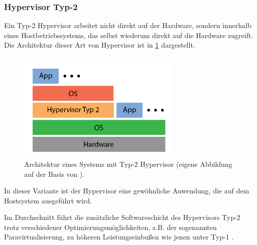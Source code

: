 \documentclass[../main.tex]{subfiles}
\begin{document}

			\subsubsection{Hypervisor Typ-2}
				Ein Typ-2 Hypervisor arbeitet nicht direkt auf der Hardware, sondern innerhalb eines Hostbetriebssystems, das selbst wiederum direkt auf die Hardware zugreift. Die Architektur dieser Art von Hypervisor ist in \fig \ref{fig:intro_hypervisor2} dargestellt.

				\begin{figure}[h]
	          \centering
	          \includegraphics[width=0.7\textwidth]{./images/intro_hypervisor2.png}
	          \caption{Architektur eines Systems mit Typ-2 Hypervisor (eigene Abbildung auf der Basis von \cite[S.107]{tanenbaumOS}).}
	          \label{fig:intro_hypervisor2}
	      \end{figure}

				In dieser Variante ist der Hypervisor eine gewöhnliche Anwendung, die auf dem Hostsystem ausgeführt wird.


				Im Durchschnitt führt die zusätzliche Softwareschicht des Hypervisors Typ-2 trotz verschiedener Optimierungsmöglichkeiten, z.B. der sogenannten Paravirtualisierung, zu höheren Leistungseinbußen wie jenen unter Typ-1 \cite[S.666f.]{tanenbaumOS}.
\end{document}

